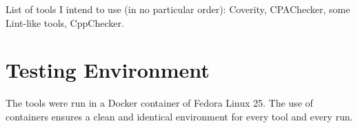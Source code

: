 List of tools I intend to use (in no particular order): Coverity, CPAChecker, some Lint-like tools, CppChecker.


\section{Testing Environment}\label{chap:techniques:env}

The tools were run in a Docker container of Fedora Linux 25. The use of
containers ensures a clean and identical environment for every tool and every
run.



